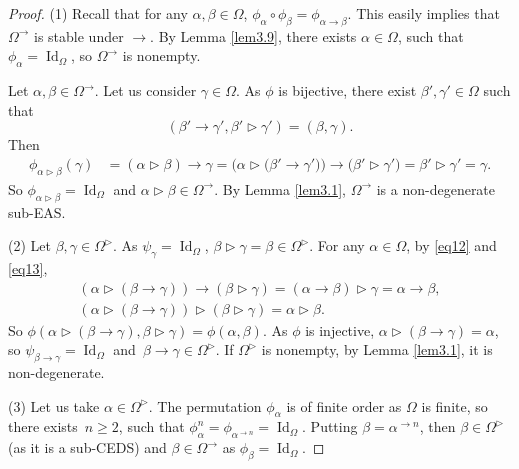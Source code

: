 \documentclass[10pt,a4paper]{amsart}
\numberwithin{equation}{section}
\begin{document}
\begin{proof}
(1) Recall that for any $\alpha,\beta \in \Omega$, $\phi_\alpha\circ \phi_\beta=\phi_{\alpha \rightarrow \beta}$. This easily implies that $\Omega^\rightarrow$ is stable under $\rightarrow$.
By Lemma \ref{lem3.9}, there exists $\alpha \in \Omega$, such that $\phi_\alpha=\operatorname{Id}_\Omega$, so $\Omega^\rightarrow$ is nonempty.

Let $\alpha,\beta \in \Omega^\rightarrow$. Let us consider $\gamma \in \Omega$. As $\phi$ is bijective, there exist $\beta',\gamma'\in \Omega$ such that
\[(\beta'\rightarrow \gamma',\beta'\triangleright \gamma')=(\beta,\gamma).\]
Then
\begin{align*}
\phi_{\alpha \triangleright \beta}(\gamma)&=(\alpha\triangleright \beta)\rightarrow \gamma=\bigl(\alpha \triangleright\bigl(\beta'\rightarrow \gamma'\bigr)\bigr)\rightarrow \bigl(\beta' \triangleright \gamma'\bigr)=\beta' \triangleright \gamma'=\gamma.
\end{align*}
So $\phi_{\alpha \triangleright \beta}=\operatorname{Id}_\Omega$ and $\alpha \triangleright \beta \in \Omega^\rightarrow$. By Lemma \ref{lem3.1}, $\Omega^\rightarrow$ is a non-degenerate sub-EAS.

(2) Let $\beta,\gamma \in \Omega^\triangleright$. As $\psi_\gamma=\operatorname{Id}_\Omega$, $\beta\triangleright \gamma=\beta \in \Omega^\triangleright$. For any $\alpha \in \Omega$, by \eqref{eq12} and \eqref{eq13},
\begin{gather*}
(\alpha \triangleright (\beta\rightarrow \gamma))\rightarrow (\beta \triangleright \gamma) =(\alpha \rightarrow \beta)\triangleright \gamma=\alpha \rightarrow \beta,\\
(\alpha \triangleright (\beta\rightarrow \gamma))\triangleright (\beta \triangleright \gamma) =\alpha \triangleright \beta.
\end{gather*}
So $\phi(\alpha \triangleright (\beta\rightarrow \gamma),\beta \triangleright \gamma)=\phi(\alpha,\beta)$.
As $\phi$ is injective, $\alpha \triangleright (\beta\rightarrow \gamma)=\alpha$, so $\psi_{\beta \rightarrow \gamma}=\operatorname{Id}_\Omega$ and~${\beta \rightarrow \gamma\in \Omega^\triangleright}$.
If $\Omega^\triangleright$ is nonempty, by Lemma \ref{lem3.1}, it is non-degenerate.

(3) Let us take $\alpha \in \Omega^\triangleright$. The permutation $\phi_\alpha$ is of finite order as $\Omega$ is finite, so there exists~${n\geqslant 2}$, such that $\phi_{\alpha}^n=\phi_{\alpha^{\rightarrow n}}=\operatorname{Id}_\Omega$.
Putting $\beta=\alpha^{\rightarrow n}$, then $\beta \in \Omega^{\triangleright}$ (as it is a sub-CEDS) and $\beta \in \Omega^\rightarrow$ as $\phi_\beta=\operatorname{Id}_\Omega$.


\end{proof}
\end{document}
